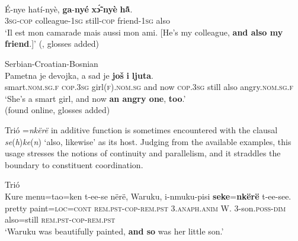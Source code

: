 \begin{exe}
	\ex {}\label{exAdditiveEwe}\\
	\gll É-nye hatí-nyè, \textbf{ga}-\textbf{nyé} \textbf{xɔ̃́}-\textbf{nyè} \textbf{hã̂}.\\
3\textsc{sg}-\textsc{cop} colleague-1\textsc{sg} still-\textsc{cop} friend-1\textsc{sg} also\\
	\glt \lq Il est mon camarade mais aussi mon ami. [He's my colleague, \textbf{and also my friend}.]' (\cite[153]{Westermann1905}, glosses added)

	\ex Serbian-Croatian-Bosnian\label{exAdditiveBCMS2}\\
		\gll Pametna je devojka, a sad je \textbf{još} \textbf{i} \textbf{ljuta}.\\
	smart.\textsc{nom}.\textsc{sg}.\textsc{f} \textsc{cop}.3\textsc{sg} girl(\textsc{f}).\textsc{nom}.\textsc{sg} and now \textsc{cop}.3\textsc{sg} still also angry.\textsc{nom}.\textsc{sg}.\textsc{f}\\
	\glt \lq She's a smart girl, and now \textbf{an angry one}, \textbf{too}.'
	\\(found online, glosses added)%
\end{exe}

Trió \mbox{=\textit{nkërë}} in additive function is sometimes encountered with the clausal  \mbox{\textit{se}(\textit{h})\textit{ke}(\textit{n})} \lq also, likewise\rq{ }as its host. Judging from the available examples, this usage stresses the notions of continuity and parallelism, and it straddles the boundary to constituent coordination.

\begin{exe}
	\ex Trió\label{exAdditiveTrio}\\
	\gll Kure	menu=tao=ken	t-ee-se			nërë,	Waruku,	i-nmuku-pisi
	\textbf{seke}=\textbf{nkërë} t-ee-see.\\
	pretty paint=\textsc{loc}=\textsc{cont} \textsc{rem}.\textsc{pst}-\textsc{cop}-\textsc{rem}.\textsc{pst} 3.\textsc{anaph}.\textsc{anim} W. 3-son.\textsc{poss}-\textsc{dim} also=still \textsc{rem}.\textsc{pst}-\textsc{cop}-\textsc{rem}.\textsc{pst}\\
	\glt \lq Waruku was beautifully painted, \textbf{and so }was her little son.\rq{}
	\\\parencite[451]{Meira1999}	
\end{exe}

